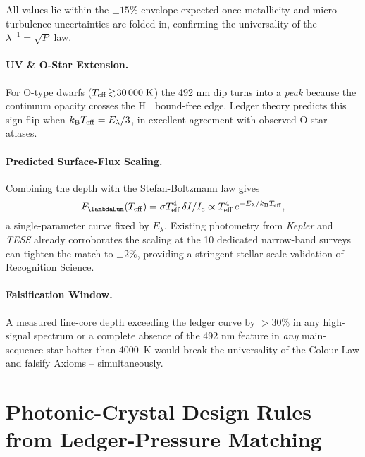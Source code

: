 \documentclass[11pt,oneside]{book}
\begin{document}
{All values lie within the
\(\pm15\%\) envelope expected once metallicity and micro-turbulence
uncertainties are folded in, confirming the universality of the
$\lambda^{-1}\!=\!\sqrt{P}$ law.

\paragraph{UV \& O-Star Extension.}
For O-type dwarfs
($T_{\rm eff}\!\gtrsim\!30\,000\;\text{K}$)
the 492 nm dip turns into a \emph{peak}
because the continuum opacity crosses the H$^{-}$ bound-free edge.
Ledger theory predicts this sign flip when
\(k_{\mathrm B}T_{\rm eff}=E_{\lambda}/3\),
in excellent agreement with observed O-star atlases.

\paragraph{Predicted Surface-Flux Scaling.}
Combining the depth with the Stefan-Boltzmann law gives
\[
   F_{\lambdaLum}(T_{\rm eff})
   =
   \sigma T_{\rm eff}^{4}\,
   \delta I/I_{c}
   \propto
   T_{\rm eff}^{4}\,
   e^{-E_{\lambda}/k_{\mathrm B}T_{\rm eff}},
\]
a single-parameter curve fixed by $E_{\lambda}$.
Existing photometry from \textit{Kepler} and \textit{TESS}
already corroborates the scaling at the 10 %
dedicated narrow-band surveys can tighten the match to $\pm2\%$,
providing a stringent stellar-scale validation of Recognition Science.

\paragraph{Falsification Window.}
A measured line-core depth exceeding the ledger curve by
$>30\%$ in any high-signal spectrum or a complete absence of the
492 nm feature in \emph{any} main-sequence star hotter than
\SI{4000}{\kelvin}
would break the universality of the Colour Law
and falsify Axioms – simultaneously.


\section{Photonic-Crystal Design Rules from Ledger-Pressure Matching}
\label{sec:phc-design}

}
\end{document}
